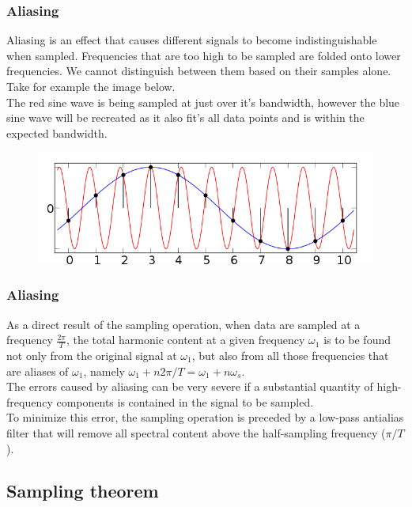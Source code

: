 \begin{frame}
	\frametitle{Aliasing}
	Aliasing is	an effect that causes different signals to become indistinguishable when sampled. Frequencies that are too high to be sampled are folded onto lower frequencies. We cannot distinguish between them based on their samples alone.\\
	\medskip
	Take for example the image below.\\
	The red sine wave is being sampled at just over it's bandwidth, however the blue sine wave will be recreated as it also fit's all data points and is within the expected bandwidth.
	\begin{figure}
		\includegraphics[width=0.8\linewidth]{aliasing}
	\end{figure}
\end{frame}

\begin{frame}
	\frametitle{Aliasing}
	As a direct result of the sampling operation, when data are sampled at a frequency $\frac{2\pi}{T}$, the total harmonic content at a given frequency $\omega_1$ is to be found not only from the original signal at $\omega_1$, but also from all those frequencies that are aliases of $\omega_1$, namely $\omega_1 + n2\pi/T = \omega_1+n\omega_s$.\\
	\medskip
	The errors caused by aliasing can be very severe if a substantial quantity of high-frequency components is contained in the signal to be sampled.\\
	\medskip
	To minimize this error, the sampling operation is preceded by a low-pass antialias filter that will remove all spectral content above the half-sampling frequency ($\pi/T$).
\end{frame}

\subsection{Sampling theorem}

